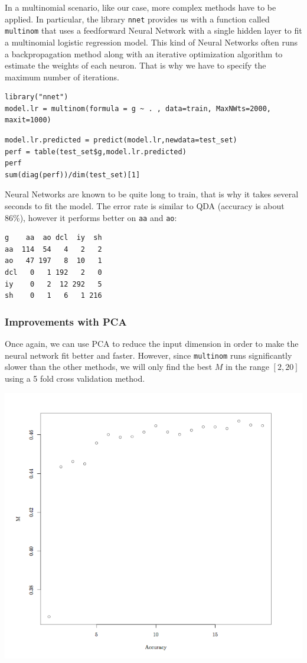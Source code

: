 \documentclass[]{report}
\begin{document}
In a multinomial scenario, like our case, more complex methods have to be applied. In particular, the library \texttt{nnet} provides us with a function called \texttt{multinom} that uses a feedforward Neural Network with a single hidden layer to fit a multinomial logistic regression model. This kind of Neural Networks often runs a backpropagation method along with an iterative optimization algorithm to estimate the weights of each neuron. That is why we have to specify the maximum number of iterations.

\begin{lstlisting}
library("nnet")
model.lr = multinom(formula = g ~ . , data=train, MaxNWts=2000, maxit=1000)
\end{lstlisting}

\begin{lstlisting}
model.lr.predicted = predict(model.lr,newdata=test_set)
perf = table(test_set$g,model.lr.predicted)
perf
sum(diag(perf))/dim(test_set)[1]
\end{lstlisting}

Neural Networks are known to be quite long to train, that is why it takes several seconds to fit the model. The error rate is similar to QDA (accuracy is about 86\%), however it performs better on \texttt{aa} and \texttt{ao}: 
\begin{verbatim}
g    aa  ao dcl  iy  sh
aa  114  54   4   2   2
ao   47 197   8  10   1
dcl   0   1 192   2   0
iy    0   2  12 292   5
sh    0   1   6   1 216
\end{verbatim}

\subsubsection{Improvements with PCA}
Once again, we can use PCA to reduce the input dimension in order to make the neural network fit better and faster. However, since \texttt{multinom} runs significantly slower than the other methods, we will only find the best $M$ in the range $[2, 20]$ using a 5 fold cross validation method.

\begin{center}
	\includegraphics[width=0.8\linewidth]{Figures/lr_pca_cv}
	\label{fig:lr_pca_cv}
\end{center}
\end{document}
